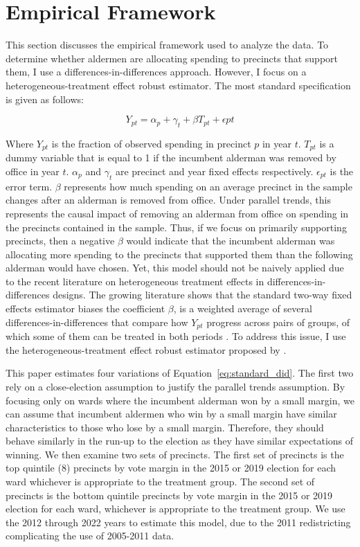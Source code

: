 \section*{Empirical Framework}
This section discusses the empirical framework used to analyze the data.
To determine whether aldermen are allocating spending to precincts that support them, I use a differences-in-differences approach.
However, I focus on a heterogeneous-treatment effect robust estimator.
The most standard specification is given as follows:

\begin{equation}\label{eq:standard_did}
    Y_{pt} = \alpha_{p} + \gamma_{t} + \beta T_{pt} + \epsilon{pt}
\end{equation}

Where $Y_{pt}$ is the fraction of observed spending in precinct $p$ in year $t$. $T_{pt}$ is a dummy variable that is equal to 1 if the incumbent alderman was removed by office in year $t$. $\alpha_{p}$ and $\gamma_{t}$ are precinct and year fixed effects respectively. $\epsilon_{pt}$ is the error term.
$\beta$ represents how much spending on an average precinct in the sample changes after an alderman is removed from office.
Under parallel trends, this represents the causal impact of removing an alderman from office on spending in the precincts contained in the sample.
Thus, if we focus on primarily supporting precincts, then a negative $\beta$ would indicate that the incumbent alderman was allocating more spending to the precincts that supported them than the following alderman would have chosen.
Yet, this model should not be naively applied due to the recent literature on heterogeneous treatment effects in differences-in-differences designs.
The growing literature shows that the standard two-way fixed effects estimator biases the coefficient $\beta$, is a weighted average of several differences-in-differences that compare how $Y_{pt}$ progress across pairs of groups, of which some of them can be treated in both periods \cite{chaisetwfe} \cite{CALLAWAY2021200}. 
To address this issue, I use the heterogeneous-treatment effect robust estimator proposed by \cite{CALLAWAY2021200}.

This paper estimates four variations of Equation~\ref{eq:standard_did}. 
The first two rely on a close-election assumption to justify the parallel trends assumption. 
By focusing only on wards where the incumbent alderman won by a small margin, we can assume that incumbent aldermen who win by a small margin have similar characteristics to those who lose by a small margin.
Therefore, they should behave similarly in the run-up to the election as they have similar expectations of winning.
We then examine two sets of precincts. 
The first set of precincts is the top quintile (8) precincts by vote margin in the 2015 or 2019 election for each ward whichever is appropriate to the treatment group. 
The second set of precincts is the bottom quintile precincts by vote margin in the 2015 or 2019 election for each ward, whichever is appropriate to the treatment group.
We use the 2012 through 2022 years to estimate this model, due to the 2011 redistricting complicating the use of 2005-2011 data. 


